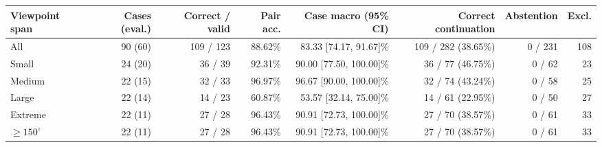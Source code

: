 \begin{tabular}{lrrrrrrr}
\toprule
Viewpoint span & Cases (eval.) & Correct / valid & Pair acc. & Case macro (95\% CI) & Correct continuation & Abstention & Excl. \\
\midrule
All & 90 (60) & 109 / 123 & 88.62\% & 83.33 [74.17, 91.67]\% & 109 / 282 (38.65\%) & 0 / 231 & 108 \\
Small & 24 (20) & 36 / 39 & 92.31\% & 90.00 [77.50, 100.00]\% & 36 / 77 (46.75\%) & 0 / 62 & 23 \\
Medium & 22 (15) & 32 / 33 & 96.97\% & 96.67 [90.00, 100.00]\% & 32 / 74 (43.24\%) & 0 / 58 & 25 \\
Large & 22 (14) & 14 / 23 & 60.87\% & 53.57 [32.14, 75.00]\% & 14 / 61 (22.95\%) & 0 / 50 & 27 \\
Extreme & 22 (11) & 27 / 28 & 96.43\% & 90.91 [72.73, 100.00]\% & 27 / 70 (38.57\%) & 0 / 61 & 33 \\
$\geq150^\circ$ & 22 (11) & 27 / 28 & 96.43\% & 90.91 [72.73, 100.00]\% & 27 / 70 (38.57\%) & 0 / 61 & 33 \\
\bottomrule
\end{tabular}
